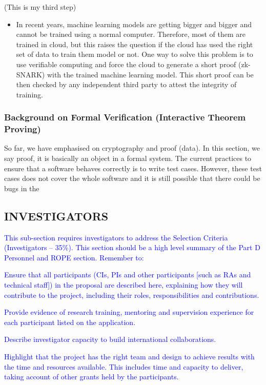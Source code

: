\documentclass[12pt,a4paper]{article}
\newcommand{\rules}[1]{\textcolor{blue}{#1}}
\newcommand*{\TitleFont}{%
      \usefont{\encodingdefault}{\rmdefault}{b}{n}%
      \fontsize{12}{12}%
      \selectfont}
\begin{document}
(This is my third step) 
\begin{itemize}
 \item In recent years,
   machine learning models are getting bigger and bigger and cannot be trained using a normal computer.
   Therefore, most of them are trained in cloud, but this
   raises the question if the cloud has used the right set of data to train them model or not.
   One way to solve this problem is to use verifiable computing and force the cloud to generate
   a short proof (zk-SNARK) with the trained machine learning model.
   This short proof can be then checked by any independent third party to attest the
   integrity of training.
  \end{itemize}


\subsubsection*{Background on Formal Verification (Interactive Theorem Proving)}

So far, we have emphasised on cryptography and proof (data). In this section, we say 
proof, it is basically an object in a formal system. The current practices to 
ensure that a software behaves correctly is to write test cases. However, 
these test cases does not cover the whole software and it is still possible that 
there could be bugs in the 






\subsection*{\TitleFont INVESTIGATORS}
\rules{This sub-section requires investigators to address the Selection Criteria (Investigators – 35\%). This section should be a high level summary of the Part D Personnel and ROPE section. Remember to:}

\rules{Ensure that all participants (CIs, PIs and other participants [such as RAs and technical staff]) in the proposal are described here, explaining how they will contribute to the project, including their roles, responsibilities and contributions.}

\rules{Provide evidence of research training, mentoring and supervision experience for each participant listed on the application.}

\rules{Describe investigator capacity to build international collaborations.}

\rules{Highlight that the project has the right team and design to achieve results with the time and resources available. This includes time and capacity to deliver, taking account of other grants held by the participants.}
\end{document}
